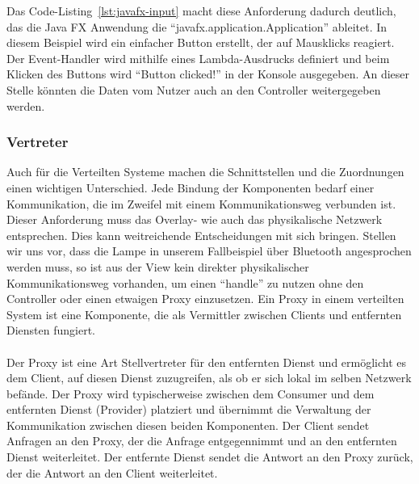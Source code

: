 \documentclass[../vs-script-first-v01.tex]{subfiles}
\begin{document}
Das Code-Listing~\ref{lst:javafx-input} macht diese Anforderung dadurch deutlich, das die Java FX Anwendung die \enquote{javafx.application.Application} ableitet. In diesem Beispiel wird ein einfacher Button erstellt, der auf Mausklicks reagiert. Der Event-Handler wird mithilfe eines Lambda-Ausdrucks definiert und beim Klicken des Buttons wird \enquote{Button clicked!} in der Konsole ausgegeben. An dieser Stelle könnten die Daten vom Nutzer auch an den Controller weitergegeben werden.

\subsubsection{Vertreter}
Auch für die Verteilten Systeme machen die Schnittstellen und die Zuordnungen einen wichtigen Unterschied. Jede Bindung der Komponenten bedarf einer Kommunikation, die im Zweifel mit einem Kommunikationsweg  verbunden ist. Dieser Anforderung muss das Overlay- wie auch das physikalische Netzwerk entsprechen. Dies kann weitreichende Entscheidungen mit sich bringen. Stellen wir uns vor, dass die Lampe in unserem Fallbeispiel über Bluetooth angesprochen werden muss, so ist aus der View kein direkter physikalischer Kommunikationsweg vorhanden, um einen \enquote{handle} zu nutzen ohne den Controller oder einen etwaigen Proxy einzusetzen.  Ein Proxy in einem verteilten System ist eine Komponente, die als Vermittler zwischen Clients und entfernten Diensten fungiert. 
\\\\
Der Proxy ist eine Art Stellvertreter für den entfernten Dienst und ermöglicht es dem Client, auf diesen Dienst zuzugreifen, als ob er sich lokal im selben Netzwerk befände.
Der Proxy wird typischerweise zwischen dem Consumer und dem entfernten Dienst (Provider) platziert und übernimmt die Verwaltung der Kommunikation zwischen diesen beiden Komponenten. Der Client sendet Anfragen an den Proxy, der die Anfrage entgegennimmt und an den entfernten Dienst weiterleitet. Der entfernte Dienst sendet die Antwort an den Proxy zurück, der die Antwort an den Client weiterleitet.\\\\
\end{document}
